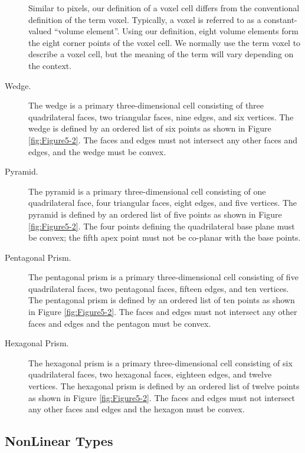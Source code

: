 \begin{description}
Similar to pixels, our definition of a voxel cell differs from the conventional definition of the term voxel. Typically, a voxel is referred to as a constant-valued “volume element”. Using our definition, eight volume elements form the eight corner points of the voxel cell. We normally use the term voxel to describe a voxel cell, but the meaning of the term will vary depending on the context.

\item[Wedge.] The wedge is a primary three-dimensional cell consisting of three quadrilateral faces, two triangular faces, nine edges, and six vertices. The wedge is defined by an ordered list of six points as shown in Figure \ref{fig:Figure5-2}. The faces and edges must not intersect any other faces and edges, and the wedge must be convex.

\item[Pyramid.] The pyramid is a primary three-dimensional cell consisting of one quadrilateral face, four triangular faces, eight edges, and five vertices. The pyramid is defined by an ordered list of five points as shown in Figure \ref{fig:Figure5-2}. The four points defining the quadrilateral base plane must be convex; the fifth apex point must not be co-planar with the base points.

\item[Pentagonal Prism.] The pentagonal prism is a primary three-dimensional cell consisting of five quadrilateral faces, two pentagonal faces, fifteen edges, and ten vertices. The pentagonal prism is defined by an ordered list of ten points as shown in Figure \ref{fig:Figure5-2}. The faces and edges must not intersect any other faces and edges and the pentagon must be convex.

\item[Hexagonal Prism.] The hexagonal prism is a primary three-dimensional cell consisting of six quadrilateral faces, two hexagonal faces, eighteen edges, and twelve vertices. The hexagonal prism is defined by an ordered list of twelve points as shown in Figure \ref{fig:Figure5-2}. The faces and edges must not intersect any other faces and edges and the hexagon must be convex.

\end{description}

\subsection{NonLinear Types}

